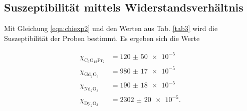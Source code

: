 \subsection{Suszeptibilität mittels Widerstandsverhältnis}
Mit Gleichung \eqref{eqn:chiexp2} und den Werten aus Tab. \ref{tab3}
wird die Suszeptibilität der Proben bestimmt.
Es ergeben sich die Werte

\begin{align*} 
   \chi_{\text{C}_6 \text{O}_{12} \text{Pr}_2} &= \num{120(50)e-5}\\
   \chi_{\text{Gd}_2 \text{O}_3} &= \num{980(17)e-5}\\
   \chi_{\text{Nd}_2 \text{O}_3} &= \num{190(18)e-5}\\
   \chi_{\text{Dy}_2 \text{O}_3} &= \num{2302(20)e-5}.
\end{align*}

